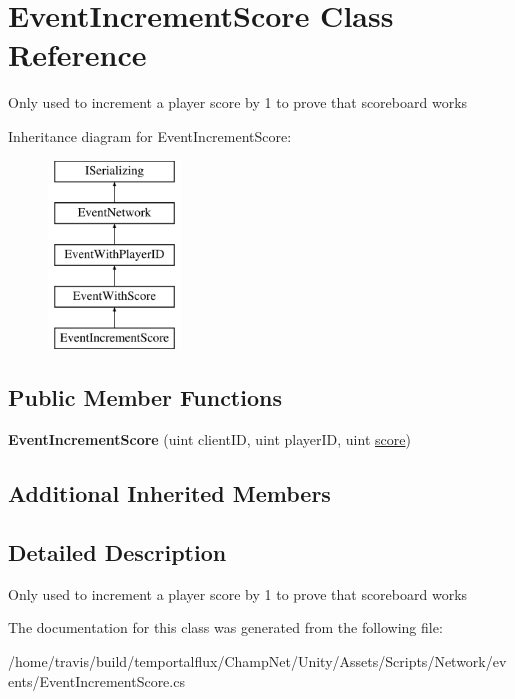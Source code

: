 \hypertarget{class_event_increment_score}{\section{Event\-Increment\-Score Class Reference}
\label{class_event_increment_score}
}


Only used to increment a player score by 1 to prove that scoreboard works  


Inheritance diagram for Event\-Increment\-Score\-:\begin{figure}[H]
\begin{center}
\leavevmode
\includegraphics[height=5.000000cm]{class_event_increment_score}
\end{center}
\end{figure}
\subsection*{Public Member Functions}
\begin{DoxyCompactItemize}
\item 
\hypertarget{class_event_increment_score_a0133296840a0225da8d18e71a092c841}{{\bfseries Event\-Increment\-Score} (uint client\-I\-D, uint player\-I\-D, uint \hyperlink{class_event_with_score_a521dbdffa1ed1b2a08a671d881f66062}{score})}\label{class_event_increment_score_a0133296840a0225da8d18e71a092c841}

\end{DoxyCompactItemize}
\subsection*{Additional Inherited Members}


\subsection{Detailed Description}
Only used to increment a player score by 1 to prove that scoreboard works 



The documentation for this class was generated from the following file\-:\begin{DoxyCompactItemize}
\item 
/home/travis/build/temportalflux/\-Champ\-Net/\-Unity/\-Assets/\-Scripts/\-Network/events/Event\-Increment\-Score.\-cs\end{DoxyCompactItemize}
